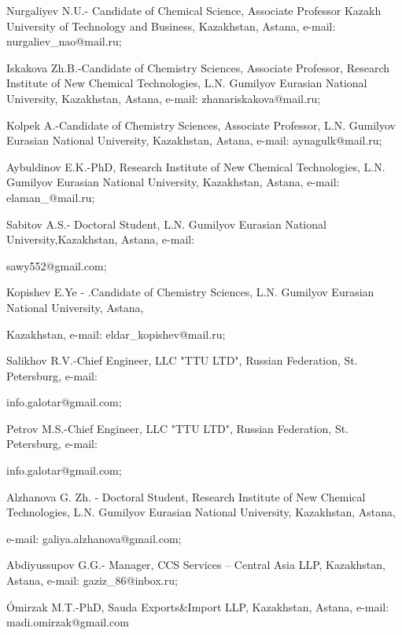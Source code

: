 \begin{noparindent}
Nurgaliyev N.U.- Candidate of Chemical Science, Associate Professor
Kazakh University of Technology and Business, Kazakhstan, Astana,
e-mail: nurgaliev\_nao@mail.ru;

Iskakova Zh.B.-Candidate of Chemistry Sciences, Associate Professor,
Research Institute of New Chemical Technologies, L.N. Gumilyov Eurasian
National University, Kazakhstan, Astana, e-mail: zhanariskakova@mail.ru;

Kolpek A.-Candidate of Chemistry Sciences, Associate Professor, L.N.
Gumilyov Eurasian National University, Kazakhstan, Astana, e-mail:
aynagulk@mail.ru;

Aybuldinov E.K.-PhD, Research Institute of New Chemical Technologies,
L.N. Gumilyov Eurasian National University, Kazakhstan, Astana, e-mail:
elaman\_@mail.ru;

Sabitov A.S.- Doctoral Student, L.N. Gumilyov Eurasian National
University,Kazakhstan, Astana, e-mail:

sawy552@gmail.com;

Kopishev E.Ye - .Candidate of Chemistry Sciences, L.N. Gumilyov Eurasian
National University, Astana,

Kazakhstan, e-mail:
eldar\_kopishev@mail.ru;

Salikhov R.V.-Chief Engineer, LLC "TTU LTD", Russian Federation, St.
Petersburg, e-mail:

info.galotar@gmail.com;

Petrov M.S.-Chief Engineer, LLC "TTU LTD", Russian Federation, St.
Petersburg, e-mail:

info.galotar@gmail.com;

Alzhanova G. Zh. - Doctoral Student, Research Institute of New Chemical
Technologies, L.N. Gumilyov Eurasian National University, Kazakhstan,
Astana,

e-mail: galiya.alzhanova@gmail.com;

Abdiyussupov G.G.- Manager, CCS Services -- Central Asia LLP,
Kazakhstan, Astana, e-mail: gaziz\_86@inbox.ru;

Ómirzak M.T.-PhD, Sauda Exports\&Import LLP, Kazakhstan, Astana, e-mail:
madi.omirzak@gmail.com
\end{noparindent}
